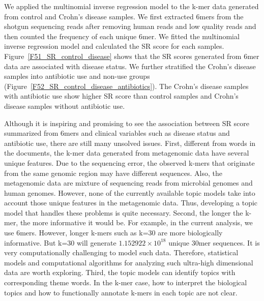 We applied the multinomial inverse regression model to the k-mer data generated from control and Crohn's disease samples. We first extracted 6mers from the shotgun sequencing reads after removing human reads and low quality reads and then counted the frequency of each unique 6mer. We fitted the multinomial inverse regression model and calculated the SR score for each samples. Figure~\ref{F51_SR_control_disease} shows that the SR scores generated from 6mer data are associated with disease status. We further stratified  the Crohn's disease samples into antibiotic use and non-use groups (Figure~\ref{F52_SR_control_disease_antibiotics}). The Crohn's disease samples with antibiotic use show higher SR score than control samples and Crohn's disease samples without antibiotic use.

Although it is inspiring  and promising to see the association between SR score summarized from 6mers and clinical variables such as disease status and antibiotic use, there are still many unsolved  issues. First, different from words in the documents, the k-mer data generated from metagenomic data have several unique features.  Due to the sequencing error, the observed k-mers that originate from the same genomic region may have different sequences. Also, the metagenomic data are mixture of sequencing reads from microbial genomes and human genomes. However, none of the currently available topic models take into account those unique features in the metagenomic data. Thus, developing a topic model that handles these problems is quite necessary. Second, the longer the k-mer, the more informative it would be. For example, in the current analysis, we use 6mers. However, longer k-mers such as k=30 are more biologically informative. But k=30 will generate $1.152922\times 10^{18} $ unique 30mer sequences. It is very computationally challenging to model such data. Therefore, statistical models and computational algorithms for analyzing such ultra-high dimensional data are worth exploring. Third, the topic models can identify  topics with corresponding  theme words. In the k-mer case, how to interpret the biological topics and how to functionally  annotate k-mers in each topic are not clear. 

 

